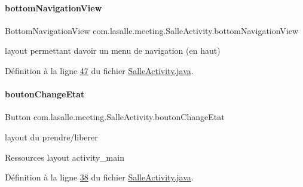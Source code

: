\paragraph{\texorpdfstring{bottom\+Navigation\+View}{bottomNavigationView}}
{\footnotesize\ttfamily Bottom\+Navigation\+View com.\+lasalle.\+meeting.\+Salle\+Activity.\+bottom\+Navigation\+View\hspace{0.3cm}{\ttfamily [private]}}



layout permettant d\textquotesingle{}avoir un menu de navigation (en haut) 



Définition à la ligne \hyperlink{_salle_activity_8java_source_l00047}{47} du fichier \hyperlink{_salle_activity_8java_source}{Salle\+Activity.\+java}.

\mbox{\label{classcom_1_1lasalle_1_1meeting_1_1_salle_activity_a0c33eac55429431e84849eca22ad3916}} 
\paragraph{\texorpdfstring{bouton\+Change\+Etat}{boutonChangeEtat}}
{\footnotesize\ttfamily Button com.\+lasalle.\+meeting.\+Salle\+Activity.\+bouton\+Change\+Etat\hspace{0.3cm}{\ttfamily [private]}}



layout du prendre/liberer 

Ressources layout activity\+\_\+main 

Définition à la ligne \hyperlink{_salle_activity_8java_source_l00038}{38} du fichier \hyperlink{_salle_activity_8java_source}{Salle\+Activity.\+java}.

\mbox{\label{classcom_1_1lasalle_1_1meeting_1_1_salle_activity_ab57d7397514ed7256304b0784f8ea7bf}} 
